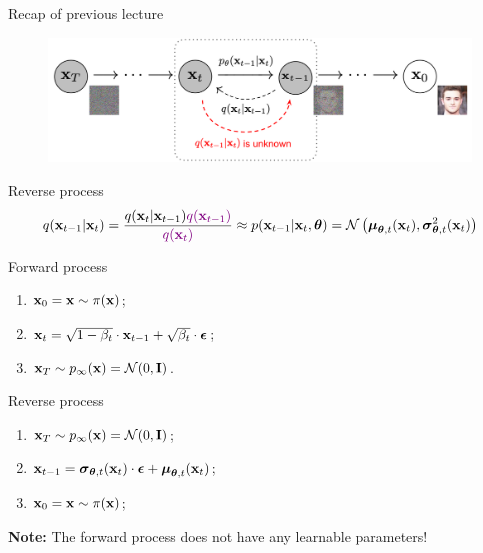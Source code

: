

\usepackage{tikz}

\usetikzlibrary{arrows,shapes,positioning,shadows,trees}

\begin{frame}
\titlepage
\end{frame}
\begin{frame}{Recap of previous lecture}
	\begin{figure}
		\includegraphics[width=0.8\linewidth]{figs/DDPM}
	\end{figure}
	\vspace{-0.5cm}
	\begin{block}{Reverse process}
		\vspace{-0.5cm}
		{\small
		\[
			q(\mathbf{x}_{t-1}|\mathbf{x}_{t}) = \frac{q(\mathbf{x}_{t}|\mathbf{x}_{t-1}) {\color{violet}q(\mathbf{x}_{t-1})}}{{\color{violet}q(\mathbf{x}_{t})}} \approx p(\mathbf{x}_{t - 1} | \mathbf{x}_t, \boldsymbol{\theta}) = \mathcal{N} \left(\boldsymbol{\mu}_{\boldsymbol{\theta}, t}(\mathbf{x}_t), \boldsymbol{\sigma}_{\boldsymbol{\theta}, t}^2(\mathbf{x}_t)\right)
		\]
		}
		\vspace{-0.5cm}
	\end{block}
	\begin{minipage}{0.5\linewidth}
		\begin{block}{Forward process}
			\begin{enumerate}
				\item $\mathbf{x}_0 = \mathbf{x} \sim \pi(\mathbf{x})$;
				\item $\mathbf{x}_t = \sqrt{1 - \beta_t} \cdot \mathbf{x}_{t - 1} + \sqrt{\beta_t} \cdot \boldsymbol{\epsilon}$;
				\item $\mathbf{x}_T \sim p_{\infty}(\mathbf{x}) = \mathcal{N}(0, \mathbf{I})$.
			\end{enumerate}
		\end{block}
	\end{minipage}%
	\begin{minipage}{0.55\linewidth}
		\begin{block}{Reverse process}
			\begin{enumerate}
				\item $\mathbf{x}_T \sim p_{\infty}(\mathbf{x}) = \mathcal{N}(0, \mathbf{I})$;
				\item $\mathbf{x}_{t - 1} = \boldsymbol{\sigma}_{\boldsymbol{\theta}, t}(\mathbf{x}_t) \cdot \boldsymbol{\epsilon} + \boldsymbol{\mu}_{\boldsymbol{\theta}, t}(\mathbf{x}_t)$;
				\item $\mathbf{x}_0 = \mathbf{x} \sim \pi(\mathbf{x})$;
			\end{enumerate}
		\end{block}
	\end{minipage}
	\textbf{Note:} The forward process does not have any learnable parameters!
\end{frame}
